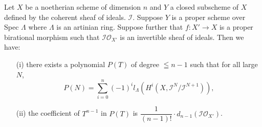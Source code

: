 \begin{theorem*}
Let $X$ be a noetherian scheme of dimension $n$ and $Y$ a closed subscheme of $X$ defined by the coherent sheaf of ideals. $\mathscr{I}$. Suppose $Y$ is a proper scheme over Spec $\Lambda$  where $\Lambda$ is an artinian ring. Suppose further that $f: X' \to X$ is a proper birational morphism such that $\mathscr{I} \mathscr{O}_{X'}$ is an invertible sheaf of ideals. Then we have:
\begin{itemize}
\item[(i)] there exists a polynomial $P(T)$ of degree $\leqq n -1$ such that for all large $N$,\pageoriginale
$$
P(N) = \sum\limits^n_{i=0} (-1)^i l_\Lambda (H^i (X, \mathscr{I}^N / \mathscr{I}^{N+1})),
$$

\item[(ii)] the coefficient of $T^{n-1}$ in $P(T)$ is $\dfrac{1}{(n-1)!} \cdot d_{n-1} (\mathscr{I} \mathscr{O}_{X'})$.
\end{itemize}
\end{theorem*}


